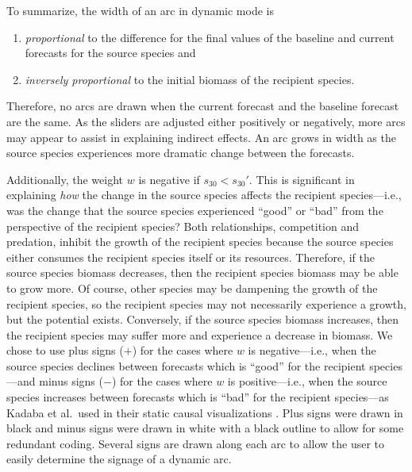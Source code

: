 To summarize, the width of an arc in dynamic mode is
\begin{enumerate}
\item \textit{proportional} to the difference for the final values of the baseline and current forecasts for the source species and
\item \textit{inversely proportional} to the initial biomass of the recipient species.
\end{enumerate}
Therefore, no arcs are drawn when the current forecast and the baseline forecast are the same.  As the sliders are adjusted either positively or negatively, more arcs may appear to assist in explaining indirect effects.  An arc grows in width as the source species experiences more dramatic change between the forecasts.

Additionally, the weight $w$ is negative if $s_{30} < s_{30}'$.  This is significant in explaining \textit{how} the change in the source species affects the recipient species---i.e., was the change that the source species experienced ``good'' or ``bad'' from the perspective of the recipient species?  Both relationships, competition and predation, inhibit the growth of the recipient species because the source species either consumes the recipient species itself or its resources.  Therefore, if the source species biomass decreases, then the recipient species biomass may be able to grow more.  Of course, other species may be dampening the growth of the recipient species, so the recipient species may not necessarily experience a growth, but the potential exists.  Conversely, if the source species biomass increases, then the recipient species may suffer more and experience a decrease in biomass.  We chose to use plus signs ($+$) for the cases where $w$ is negative---i.e., when the source species declines between forecasts which is ``good'' for the recipient species---and minus signs ($-$) for the cases where $w$ is positive---i.e., when the source species increases between forecasts which is ``bad'' for the recipient species---as Kadaba et al.\ used in their static causal visualizations \cite{kadaba2007}.  Plus signs were drawn in black and minus signs were drawn in white with a black outline to allow for some redundant coding.  Several signs are drawn along each arc to allow the user to easily determine the signage of a dynamic arc.

